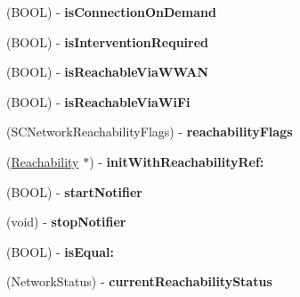 \begin{DoxyCompactItemize}
\item 
\hypertarget{interface_reachability_af5bea7c2cfd6439a4ff5f0ab0b92e37b}{
(\-B\-O\-O\-L) -\/ {\bfseries is\-Connection\-On\-Demand}}
\label{interface_reachability_af5bea7c2cfd6439a4ff5f0ab0b92e37b}

\item 
\hypertarget{interface_reachability_ad44af2ebf5ffd986dacad06e63362550}{
(\-B\-O\-O\-L) -\/ {\bfseries is\-Intervention\-Required}}
\label{interface_reachability_ad44af2ebf5ffd986dacad06e63362550}

\item 
\hypertarget{interface_reachability_a20011128b407d36659bc78a64cd583f5}{
(\-B\-O\-O\-L) -\/ {\bfseries is\-Reachable\-Via\-W\-W\-A\-N}}
\label{interface_reachability_a20011128b407d36659bc78a64cd583f5}

\item 
\hypertarget{interface_reachability_a994f39db8e47480480ffd7ee81159ecb}{
(\-B\-O\-O\-L) -\/ {\bfseries is\-Reachable\-Via\-Wi\-Fi}}
\label{interface_reachability_a994f39db8e47480480ffd7ee81159ecb}

\item 
\hypertarget{interface_reachability_ac9080e40006cd8c82431a668ec8bfe18}{
(\-S\-C\-Network\-Reachability\-Flags) -\/ {\bfseries reachability\-Flags}}
\label{interface_reachability_ac9080e40006cd8c82431a668ec8bfe18}

\item 
\hypertarget{interface_reachability_af8dbb23cc7f9ac59b0269dfaf83979fc}{
(\hyperlink{interface_reachability}{\-Reachability} $\ast$) -\/ {\bfseries init\-With\-Reachability\-Ref\-:}}
\label{interface_reachability_af8dbb23cc7f9ac59b0269dfaf83979fc}

\item 
\hypertarget{interface_reachability_ae20732960a222681fcc7caeb191158bc}{
(\-B\-O\-O\-L) -\/ {\bfseries start\-Notifier}}
\label{interface_reachability_ae20732960a222681fcc7caeb191158bc}

\item 
\hypertarget{interface_reachability_ab7907e9c8de0e4e15774e82c089e0b39}{
(void) -\/ {\bfseries stop\-Notifier}}
\label{interface_reachability_ab7907e9c8de0e4e15774e82c089e0b39}

\item 
\hypertarget{interface_reachability_a7158fbf023168ca543a1340d6b3ce7fb}{
(\-B\-O\-O\-L) -\/ {\bfseries is\-Equal\-:}}
\label{interface_reachability_a7158fbf023168ca543a1340d6b3ce7fb}

\item 
\hypertarget{interface_reachability_a8396438436e7ff3770039fb527cd1d34}{
(\-Network\-Status) -\/ {\bfseries current\-Reachability\-Status}}
\label{interface_reachability_a8396438436e7ff3770039fb527cd1d34}


\end{DoxyCompactItemize}
